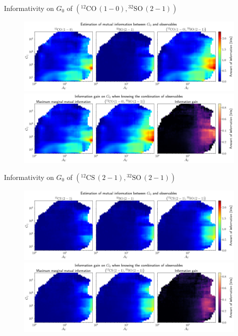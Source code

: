 \documentclass{beamer}
\begin{document}
\begin{frame}{Informativity on $G_0$ of $\left(\mathrm{^{12}CO\,(1-0)},\mathrm{^{32}SO\,(2-1)}\right)$}
    \begin{figure}
        \centering
        \includegraphics[width=0.95\linewidth]{../mi/g0__12co10_32so21_mi.png}
        \vfill
        \includegraphics[width=0.95\linewidth]{../mi/g0__12co10_32so21_mi_gain.png}
    \end{figure}
\end{frame}

\begin{frame}{Informativity on $G_0$ of $\left(\mathrm{^{12}CS\,(2-1)},\mathrm{^{32}SO\,(2-1)}\right)$}
    \begin{figure}
        \centering
        \includegraphics[width=0.95\linewidth]{../mi/g0__12cs21_32so21_mi.png}
        \vfill
        \includegraphics[width=0.95\linewidth]{../mi/g0__12cs21_32so21_mi_gain.png}
    \end{figure}
\end{frame}
\end{document}
